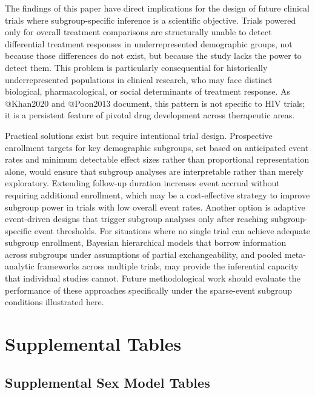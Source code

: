 \documentclass[
  letterpaper,
  DIV=11,
  numbers=noendperiod]{scrartcl}
\begin{document}
The findings of this paper have direct implications for the design of
future clinical trials where subgroup-specific inference is a scientific
objective. Trials powered only for overall treatment comparisons are
structurally unable to detect differential treatment responses in
underrepresented demographic groups, not because those differences do
not exist, but because the study lacks the power to detect them. This
problem is particularly consequential for historically underrepresented
populations in clinical research, who may face distinct biological,
pharmacological, or social determinants of treatment response. As
@Khan2020 and @Poon2013 document, this pattern is not specific to HIV
trials; it is a persistent feature of pivotal drug development across
therapeutic areas.

Practical solutions exist but require intentional trial design.
Prospective enrollment targets for key demographic subgroups, set based
on anticipated event rates and minimum detectable effect sizes rather
than proportional representation alone, would ensure that subgroup
analyses are interpretable rather than merely exploratory. Extending
follow-up duration increases event accrual without requiring additional
enrollment, which may be a cost-effective strategy to improve subgroup
power in trials with low overall event rates. Another option is adaptive
event-driven designs that trigger subgroup analyses only after reaching
subgroup-specific event thresholds. For situations where no single trial
can achieve adequate subgroup enrollment, Bayesian hierarchical models
that borrow information across subgroups under assumptions of partial
exchangeability, and pooled meta-analytic frameworks across multiple
trials, may provide the inferential capacity that individual studies
cannot. Future methodological work should evaluate the performance of
these approaches specifically under the sparse-event subgroup conditions
illustrated here.

\newpage
\appendix

\section{Supplemental Tables}\label{supplemental-tables}

\subsection{Supplemental Sex Model
Tables}\label{supplemental-sex-model-tables}
\end{document}
